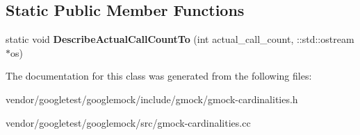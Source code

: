\subsection*{Static Public Member Functions}
\begin{DoxyCompactItemize}
\item 
\mbox{\label{classtesting_1_1_cardinality_a7cbea339e2f3072a98367e087aa296e8}} 
static void {\bfseries Describe\+Actual\+Call\+Count\+To} (int actual\+\_\+call\+\_\+count, \+::std\+::ostream $\ast$os)
\end{DoxyCompactItemize}


The documentation for this class was generated from the following files\+:\begin{DoxyCompactItemize}
\item 
vendor/googletest/googlemock/include/gmock/gmock-\/cardinalities.\+h\item 
vendor/googletest/googlemock/src/gmock-\/cardinalities.\+cc\end{DoxyCompactItemize}

